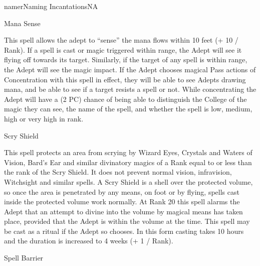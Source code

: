 \begin{college}[2.0]{namer}{Naming Incantations}{NA}
\begin{spell}[S-7]{Mana Sense}
\begin{effects}
This spell allows the adept to ``sense'' the mana flows within 10 feet
(+ 10 / Rank). If a spell is cast or magic triggered within range, the
Adept will see it flying off towards its target. Similarly, if the
target of any spell is within range, the Adept will see the magic
impact.  If the Adept chooses magical Pass actions of Concentration
with this spell in effect, they will be able to see Adepts drawing
mana, and be able to see if a target resists a spell or not. While
concentrating the Adept will have a (2 \x PC) chance of being able to
distinguish the College of the magic they can see, the name of the
spell, and whether the spell is low, medium, high or very high in
rank.
\end{effects}
\end{spell}

\begin{spell}[S-8]{Scry Shield}
\begin{effects}
This spell protects an area from scrying by Wizard Eyes, Crystals and
Waters of Vision, Bard's Ear and similar divinatory magics of a Rank
equal to or less than the rank of the Scry Shield. It does not prevent
normal vision, infravision, Witchsight and similar spells. A Scry
Shield is a shell over the protected volume, so once the area is
penetrated by any means, \eg on foot or by flying, spells cast inside
the protected volume work normally. At Rank 20 this spell alarms the
Adept that an attempt to divine into the volume by magical means has
taken place, provided that the Adept is within the volume at the time.
This spell may be cast as a ritual if the Adept so chooses.  In this
form casting takes 10 hours and the duration is increased to 4 weeks
(+ 1 / Rank).
\end{effects}
\end{spell}

\begin{spell}[S-9]{Spell Barrier}


\end{spell}
\end{college}
